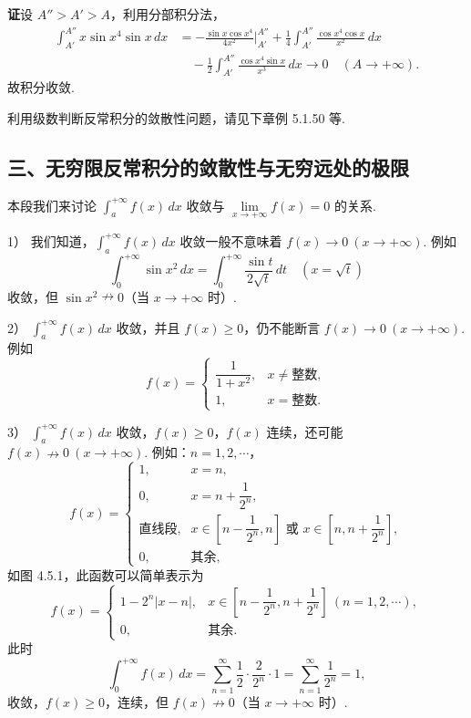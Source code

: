 \documentclass[UTF8,12pt,a4paper,fontset=fandol]{ctexart}
\begin{document}
\noindent\textbf{证}\quad 设 $A''>A'>A$，利用分部积分法，
\[
\begin{aligned}
\int_{A'}^{A''}x\sin x^4\sin x\,dx
&=-\frac{\sin x\cos x^4}{4x^2}\Big|_{A'}^{A''}
+\frac14\int_{A'}^{A''}\frac{\cos x^4\cos x}{x^2}\,dx\\
&\quad-\frac12\int_{A'}^{A''}\frac{\cos x^4\sin x}{x^3}\,dx
\longrightarrow0\quad(A\to+\infty).
\end{aligned}
\]
故积分收敛.

利用级数判断反常积分的敛散性问题，请见下章例 5.1.50 等.

\subsection*{三、无穷限反常积分的敛散性与无穷远处的极限}

本段我们来讨论 $\displaystyle\int_a^{+\infty}f(x)\,dx$ 收敛与 $\lim\limits_{x\to+\infty}f(x)=0$ 的关系.

1） 我们知道，$\displaystyle\int_a^{+\infty}f(x)\,dx$ 收敛一般不意味着 $f(x)\to0\ (x\to+\infty)$. 例如
\[
\int_0^{+\infty}\sin x^2\,dx
=\int_0^{+\infty}\frac{\sin t}{2\sqrt t}\,dt
\quad(x=\sqrt t)
\]
收敛，但 $\sin x^2\nrightarrow0$（当 $x\to+\infty$ 时）.

2） $\displaystyle\int_a^{+\infty}f(x)\,dx$ 收敛，并且 $f(x)\ge0$，仍不能断言 $f(x)\to0\ (x\to+\infty)$. 例如
\[
f(x)=
\begin{cases}
\dfrac1{1+x^2},&x\ne\text{整数},\\
1,&x=\text{整数}.
\end{cases}
\]

3） $\displaystyle\int_a^{+\infty}f(x)\,dx$ 收敛，$f(x)\ge0$，$f(x)$ 连续，还可能 $f(x)\nrightarrow0\ (x\to+\infty)$. 例如：$n=1,2,\cdots$，
\[
f(x)=
\begin{cases}
1,&x=n,\\
0,&x=n+\dfrac1{2^n},\\
\text{直线段},&x\in\left[n-\dfrac1{2^n},n\right]\text{ 或 }x\in\left[n,n+\dfrac1{2^n}\right],\\
0,&\text{其余},
\end{cases}
\]
如图 4.5.1，此函数可以简单表示为
\[
f(x)=
\begin{cases}
1-2^n|x-n|,&x\in\left[n-\dfrac1{2^n},n+\dfrac1{2^n}\right]\ (n=1,2,\cdots),\\
0,&\text{其余}.
\end{cases}
\]
此时
\[
\int_0^{+\infty}f(x)\,dx
=\sum_{n=1}^\infty\frac12\cdot\frac2{2^n}\cdot1
=\sum_{n=1}^\infty\frac1{2^n}=1,
\]
收敛，$f(x)\ge0$，连续，但 $f(x)\nrightarrow0$（当 $x\to+\infty$ 时）.
\end{document}
